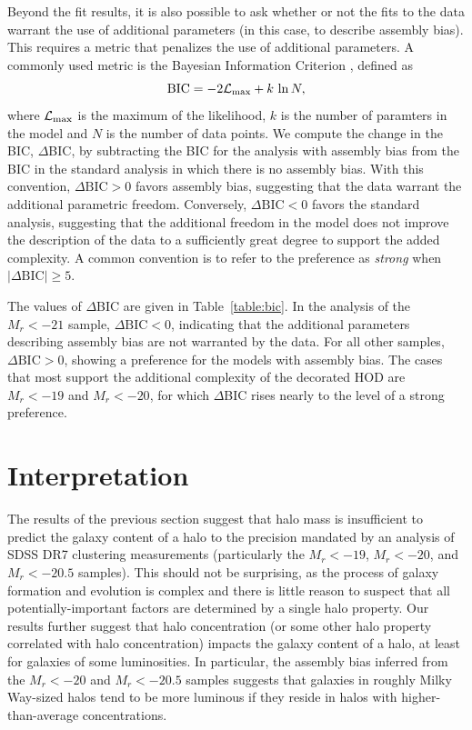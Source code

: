 \documentclass[usenatbib,usegraphicx,letterpaper]{mn2e}
\newcommand{\magr}{M_r}
\begin{document}
Beyond the fit results, it is also possible to ask whether or not the fits to the data warrant the use of 
additional parameters (in this case, to describe assembly bias). This requires a metric that penalizes the 
use of additional parameters. A commonly used metric is the Bayesian Information Criterion 
\citep[BIC,][]{schwarz78}, defined as 
%
\begin{equation}
\mathrm{BIC} = -2 \mathcal{L}_{\rm max} + k\, \ln N, 
\end{equation}
%
where $\mathcal{L}_{\rm max}$ is the maximum of the likelihood, 
$k$ is the number of paramters in the model and $N$ is the number of 
data points. We compute the change in the BIC, $\Delta$BIC, by subtracting 
the BIC for the analysis with assembly bias from the BIC in the standard analysis 
in which there is no assembly bias. With this convention, $\Delta \mathrm{BIC} > 0$ 
favors assembly bias, suggesting that the data warrant the additional parametric freedom. 
Conversely, $\Delta \mathrm{BIC} < 0$ favors the standard analysis, 
suggesting that the additional freedom in the model does not improve the description of the data 
to a sufficiently great degree to support the added complexity. 
A common convention is to refer to the preference as 
{\em strong} when $\vert \Delta \mathrm{BIC}\vert \ge 5$. 

The values of $\Delta$BIC are given in Table~\ref{table:bic}. In the analysis of the $\magr < -21$ sample, 
$\Delta \mathrm{BIC} < 0$, indicating that the additional parameters describing assembly bias are not 
warranted by the data. For all other samples, $\Delta \mathrm{BIC} > 0$, showing a preference for 
the models with assembly bias. The cases that most support the additional complexity 
of the decorated HOD are $\magr < -19$ and $\magr < -20$, for which $\Delta$BIC 
rises nearly to the level of a {\rm strong} preference. 

\section{Interpretation}
\label{section:discussion}

The results of the previous section suggest that halo mass is insufficient to predict 
the galaxy content of a halo to the precision mandated by an analysis of SDSS DR7 
clustering measurements (particularly the $\magr < -19$, $\magr < -20$, and $\magr < -20.5$ samples). 
This should not be surprising, as the process of galaxy formation and evolution is complex and 
there is little reason to suspect that all potentially-important factors are determined by a single halo property. 
Our results further suggest that halo concentration (or some other halo property correlated 
with halo concentration) impacts the galaxy content of a halo, at least for galaxies of some 
luminosities. In particular, the assembly bias inferred from the $\magr < -20$ and $\magr < -20.5$ 
samples suggests that galaxies in roughly Milky Way-sized halos tend to be more luminous 
if they reside in halos with higher-than-average concentrations. 
\end{document}
